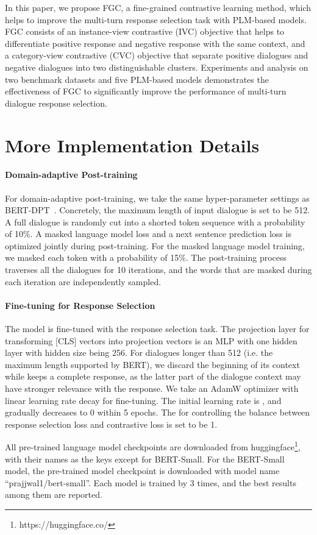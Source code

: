 \documentclass[letterpaper]{article} \usepackage{aaai22}  \usepackage{times}  \usepackage{helvet}  \usepackage{courier}  \usepackage[hyphens]{url}  \usepackage{graphicx} \urlstyle{rm} \def\UrlFont{\rm}  \usepackage{natbib}  \usepackage{caption} \DeclareCaptionStyle{ruled}{labelfont=normalfont,labelsep=colon,strut=off} \frenchspacing  \setlength{\pdfpagewidth}{8.5in}  \setlength{\pdfpageheight}{11in}  \usepackage{algorithm}
\begin{document}
In this paper, we propose FGC, a fine-grained contrastive learning method, which helps to improve the multi-turn response selection task with PLM-based models. FGC consists of an instance-view contrastive (IVC) objective that helps to differentiate positive response and negative response with the same context, and a category-view contrastive (CVC) objective that separate positive dialogues and negative dialogues into two distinguishable clusters. Experiments and analysis on two benchmark datasets and five PLM-based models demonstrates the effectiveness of FGC to significantly improve the performance of multi-turn dialogue response selection.
 


\clearpage
\appendix
\section{More Implementation Details}
\label{appendix:details}

\paragraph{Domain-adaptive Post-training} For domain-adaptive post-training, we take the same hyper-parameter settings as BERT-DPT~\cite{whang2020domain}. Concretely, the maximum length of input dialogue is set to be 512. 
A full dialogue is randomly cut into a shorted token sequence with a probability of 10\%. 
A masked language model loss and a next sentence prediction loss is optimized jointly during post-training. 
For the masked language model training, we masked each token with a probability of 15\%. The post-training process traverses all the dialogues for 10 iterations, and the words that are masked during each iteration are independently sampled. 

\paragraph{Fine-tuning for Response Selection} The model is fine-tuned with the response selection task. The projection layer for transforming [CLS] vectors into projection vectors  is an MLP with one hidden layer with hidden size being 256. For dialogues longer than 512 (i.e. the maximum length supported by BERT), we discard the beginning of its context while keeps a complete response, as the latter part of the dialogue context may have stronger relevance with the response. We take an AdamW optimizer\cite{loshchilov2017decoupled} with linear learning rate decay for fine-tuning. The initial learning rate is , and gradually decreases to 0 within 5 epochs. The  for controlling the balance between response selection loss and contrastive loss is set to be 1.

All pre-trained language model checkpoints are downloaded from huggingface\footnote{https://huggingface.co/}, with their names as the keys except for BERT-Small. For the BERT-Small model, the pre-trained model checkpoint is downloaded  with model name ``prajjwal1/bert-small''.
Each model is trained by 3 times, and the best results among them are reported.

 
\end{document}

